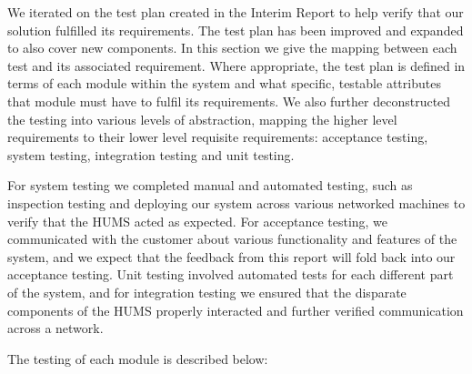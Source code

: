\documentclass[10pt,a4paper]{article}
\begin{document}
We iterated on the test plan created in the Interim Report to help verify that our solution fulfilled its requirements. The test plan has been improved and expanded to also cover new components. In this section we give the mapping between each test and its associated requirement. Where appropriate, the test plan is defined in terms of each module within the system and what specific, testable attributes that module must have to fulfil its requirements. We also further deconstructed the testing into various levels of abstraction, mapping the higher level requirements to their lower level requisite requirements: acceptance testing, system testing, integration testing and unit testing.

For system testing we completed manual and automated testing, such as inspection testing and deploying our system across various networked machines to verify that the HUMS acted as expected. For acceptance testing, we communicated with the customer about various functionality and features of the system, and we expect that the feedback from this report will fold back into our acceptance testing. Unit testing involved automated tests for each different part of the system, and for integration testing we ensured that the disparate components of the HUMS properly interacted and further verified communication across a network.

The testing of each module is described below:
\end{document}
